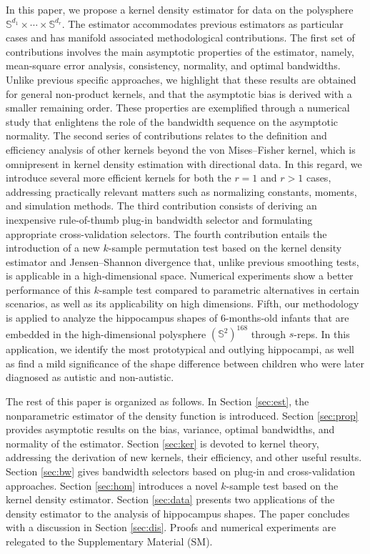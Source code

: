 \documentclass[oneside,11pt]{article}
\begin{document}
%
In this paper, we propose a kernel density estimator for data on the polysphere $\mathbb{S}^{d_1}\times\cdots\times\mathbb{S}^{d_r}$. The estimator accommodates previous estimators as particular cases and has manifold associated methodological contributions. The first set of contributions involves the main asymptotic properties of the estimator, namely, mean-square error analysis, consistency, normality, and optimal bandwidths. Unlike previous specific approaches, we highlight that these results are obtained for general non-product kernels, and that the asymptotic bias is derived with a smaller remaining order. These properties are exemplified through a numerical study that enlightens the role of the bandwidth sequence on the asymptotic normality. The second series of contributions relates to the definition and efficiency analysis of other kernels beyond the von Mises--Fisher kernel, which is omnipresent in kernel density estimation with directional data. In this regard, we introduce several more efficient kernels for both the $r=1$ and $r>1$ cases, addressing practically relevant matters such as normalizing constants, moments, and simulation methods. The third contribution consists of deriving an inexpensive rule-of-thumb plug-in bandwidth selector and formulating appropriate cross-validation selectors. The fourth contribution entails the introduction of a new $k$-sample permutation test based on the kernel density estimator and Jensen--Shannon divergence that, unlike previous smoothing tests, is applicable in a high-dimensional space. Numerical experiments show a better performance of this $k$-sample test compared to parametric alternatives in certain scenarios, as well as its applicability on high dimensions. Fifth, our methodology is applied to analyze the hippocampus shapes of 6-months-old infants \citep{liu2021fitting,liu2023geometric} that are embedded in the high-dimensional polysphere $(\mathbb{S}^2)^{168}$ through $s$-reps. In this application, we identify the most prototypical and outlying hippocampi, as well as find a mild significance of the shape difference between children who were later diagnosed as autistic and non-autistic.

%
The rest of this paper is organized as follows. In Section \ref{sec:est}, the nonparametric estimator of the density function is introduced. Section \ref{sec:prop} provides asymptotic results on the bias, variance, optimal bandwidths, and normality of the estimator. Section \ref{sec:ker} is devoted to kernel theory, addressing the derivation of new kernels, their efficiency, and other useful results. Section \ref{sec:bw} gives bandwidth selectors based on plug-in and cross-validation approaches. Section \ref{sec:hom} introduces a novel $k$-sample test based on the kernel density estimator. Section \ref{sec:data} presents two applications of the density estimator to the analysis of hippocampus shapes. The paper concludes with a discussion in Section \ref{sec:dis}. Proofs and numerical experiments are relegated to the Supplementary Material (SM).
\end{document}
